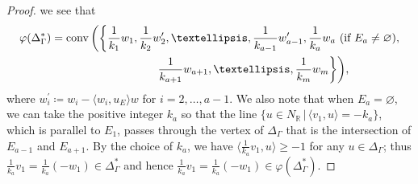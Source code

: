 \documentclass[11pt]{article}
\numberwithin{equation}{section}
\numberwithin{equation}{section}
\numberwithin{figure}{section}
\numberwithin{table}{section}
\newcommand{\RR}{\mathbb{R}}
\begin{document}
\begin{proof}
we see that
\begin{gather}
\varphi(\Delta_\Gamma^*)=\operatorname{conv}\bigg(\bigg\{\frac{1}{k_1}w_1,\frac{1}{k_2}w_2^\prime,\dots,\frac{1}{k_{a-1}}w_{a-1}^\prime,
\frac{1}{k_a}w_a \ \text{(if $E_a\neq\varnothing$)}, \nonumber\\
\hphantom{\varphi(\Delta_\Gamma^*)=\operatorname{conv}\bigg(\bigg\{}{}
\frac{1}{k_{a+1}}w_{a+1}, \dots,\frac{1}{k_m}w_m\bigg\}\bigg),\label{generating_set_dual}
\end{gather}
where $w_i^\prime\coloneqq w_i-\langle w_i,u_E\rangle w$ for $i=2,\dots,a-1$.
We also note that when $E_a=\varnothing$, we can take the positive integer $k_a$ so that the line $\{u\in N_\RR\,|\,\langle v_1,u\rangle= -k_a\}$, which is parallel to $E_1$, passes through the vertex of $\Delta_\Gamma$ that is the intersection of $E_{a-1}$ and $E_{a+1}$.
By the choice of $k_a$, we have $\langle \frac{1}{k_a}v_1,u\rangle\ge -1$ for any $u\in \Delta_\Gamma$; thus $\frac{1}{k_a}v_1=\frac{1}{k_a}(-w_1)\in\Delta_\Gamma^*$ and hence $\frac{1}{k_a}v_1=\frac{1}{k_a}(-w_1)\in\varphi(\Delta_\Gamma^*)$.


\end{proof}
\end{document}
